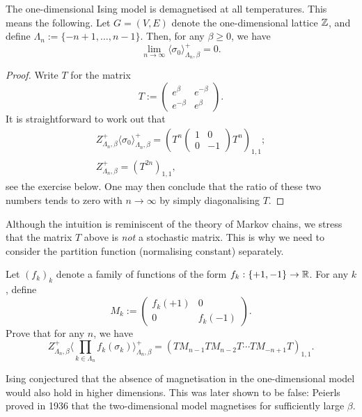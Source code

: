 \begin{theorem}[Ising, 1924]
    The one-dimensional Ising model is demagnetised at all temperatures.
    This means the following.
    Let $G=(V,E)$ denote the one-dimensional lattice $\mathbb Z$,
    and define $\Lambda_n:=\{-n+1,\ldots,n-1\}$.
    Then, for any $\beta\geq 0$, we have
    \[
        \lim_{n\to\infty}\langle\sigma_0\rangle_{\Lambda_n,\beta}^+
        =
        0
        .
    \]
\end{theorem}

\begin{proof}
    Write $T$ for the matrix
    \[
        T:=
        \begin{pmatrix}
            e^{\beta} & e^{-\beta} \\
            e^{-\beta} & e^{\beta}
        \end{pmatrix}.
    \]
    It is straightforward to work out that
    \begin{gather}
        Z_{\Lambda_n,\beta}^+\langle\sigma_0\rangle_{\Lambda_n,\beta}^+
        =
        \left(T^n
            \begin{pmatrix}
                1 & 0 \\ 0 & -1
            \end{pmatrix}
            T^n
            \right)_{1,1};
        \\
        Z_{\Lambda_n,\beta}^+ = \left(T^{2n}\right)_{1,1},
    \end{gather}
    see the exercise below.
    One may then conclude that the ratio of these two numbers tends to zero 
    with $n\to\infty$
    by simply diagonalising $T$.
\end{proof}

\begin{remark}
    Although the intuition is reminiscent
    of the theory of Markov chains, we stress that the matrix
    $T$ above is \emph{not} a stochastic matrix.
    This is why we need to consider the partition function
    (normalising constant) separately.
\end{remark}

\begin{exercise}
    Let $(f_k)_k$ denote a family of functions
    of the form $f_k:\{+1,-1\}\to\mathbb R$.
    For any $k$, define
    \[ M_k:=\begin{pmatrix}
        f_{k}(+1) & 0 \\
        0 & f_{k}(-1)
    \end{pmatrix}.\] 
    Prove that for any $n$,
    we have
    \[
        Z_{\Lambda_n,\beta}^+
        \langle\textstyle\prod_{k\in\Lambda_n} f_k(\sigma_{k})\rangle_{\Lambda_n,\beta}^+
        =
        \left(
            T
            M_{n-1}
            T
            M_{n-2}
            T
            \cdots
            T
            M_{-n+1}
            T
        \right)_{1,1}.
    \]
\end{exercise}

\begin{remark}
    Ising conjectured that the absence of magnetisation in the one-dimensional
    model would also hold in higher dimensions. This was later shown to be
    false: Peierls proved in 1936 that the two-dimensional model magnetises for
    sufficiently large $\beta$.
\end{remark}
